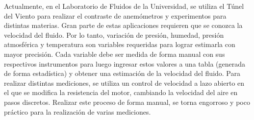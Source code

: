 Actualmente, en el Laboratorio de Fluidos de la Universidad, se utiliza el Túnel del Viento para realizar el contraste de anemómetros y experimentos para distintas materias. Gran parte de estas aplicaciones requieren que se conozca la velocidad del fluido. Por lo tanto, variación de presión, humedad, presión atmosférica y temperatura son variables requeridas para lograr estimarla con mayor precisión.
Cada variable debe ser medida de forma manual con sus respectivos instrumentos para luego ingresar estos valores a una tabla (generada de forma estadística) y obtener una estimación de la velocidad del fluido.
Para realizar distintas mediciones, se utiliza un control de velocidad a lazo abierto en el que se modifica la resistencia del motor, cambiando la velocidad del aire en pasos discretos.
Realizar este proceso de forma manual, se torna engorroso y poco práctico para la realización de varias mediciones.